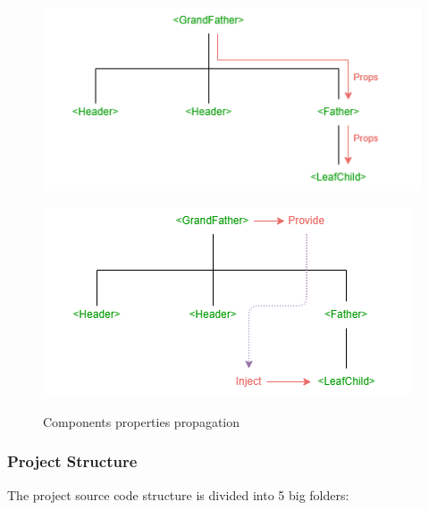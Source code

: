             \begin{figure}[H]
                \begin{minipage}{0.5\textwidth}
                    \includegraphics[width=\textwidth]{Images/Frontend/no_provide_inject.png}
                    \label{code:no_provide_inject}
                \end{minipage}
                \begin{minipage}{0.5\textwidth}
                    \includegraphics[width=\textwidth]{Images/Frontend/provide_inject.png}
                    \label{fig:provide_inject}
                \end{minipage}
                \label{fig:props_propagation}
                \caption{Components properties propagation}
            \end{figure}
        
    
    \subsubsection{Project Structure}
        The project source code structure is divided into 5 big folders:
        
